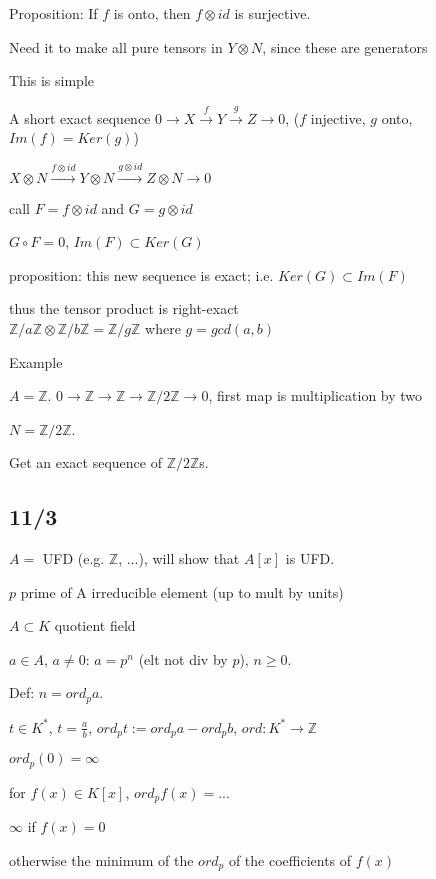\documentclass[12pt]{article}
\begin{document}
Proposition: If $f$ is onto, then $f \otimes id$ is surjective.

Need it to make all pure tensors in $Y \otimes N$, since these are generators

This is simple

\noindent
A short exact sequence $0 \to X \xrightarrow{f} Y \xrightarrow{g} Z \to 0$, ($f$ injective, $g$ onto, $Im(f) = Ker(g)$)

$X \otimes N \xrightarrow{f \otimes id} Y \otimes N \xrightarrow{g \otimes id} Z \otimes N \to 0$

call $F = f\otimes id$ and $G = g \otimes id$

$G \circ F = 0$, $Im(F) \subset Ker(G)$

proposition: this new sequence is exact; i.e. $Ker(G) \subset Im(F)$

thus the tensor product is right-exact\\

\noindent
$\mathds{Z}/a\mathds{Z} \otimes \mathds{Z}/b\mathds{Z} = \mathds{Z}/g\mathds{Z}$ where $g = gcd(a, b)$

\noindent
Example

$A = \mathds{Z}$.  $0 \to \mathds{Z} \to \mathds{Z} \to \mathds{Z}/2\mathds{Z} \to 0$, first map is multiplication by two

$N = \mathds{Z}/2\mathds{Z}$.

Get an exact sequence of $\mathds{Z}/2\mathds{Z}$s.

\subsection{11/3}

\noindent
$A =$ UFD (e.g. $\mathds{Z}$, ...), will show that $A[x]$ is UFD.

$p$ prime of A irreducible element (up to mult by units)

$A \subset K$ quotient field

$a \in A$, $a \neq 0$: $a = p^n$ (elt not div by $p$), $n \geq 0$.

Def: $n = ord_pa$.

$t \in K^*$, $t = \frac{a}{b}$, $ord_pt := ord_pa - ord_pb$, $ord: K^* \to \mathds{Z}$

$ord_p(0) = \infty$

for $f(x) \in K[x]$, $ord_pf(x) =$...

$\infty$ if $f(x) = 0$

otherwise the minimum of the $ord_p$ of the coefficients of $f(x)$
\end{document}
